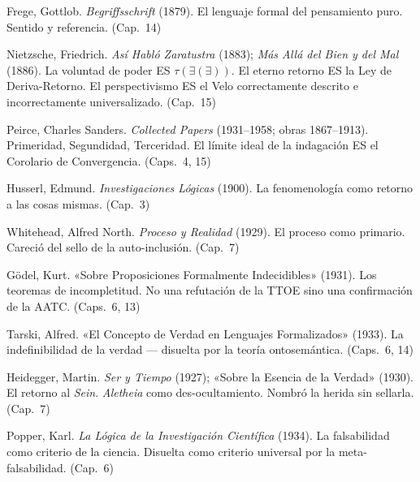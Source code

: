 \documentclass[10pt, openany, oneside]{book}
\begin{document}
{\noindent Frege, Gottlob. \textit{Begriffsschrift} (1879). El lenguaje formal del pensamiento puro. Sentido y referencia. (Cap.\ 14)

\vspace{0.3em}

\noindent Nietzsche, Friedrich. \textit{Así Habló Zaratustra} (1883); \textit{Más Allá del Bien y del Mal} (1886). La voluntad de poder ES $\tau(\exists(\exists))$. El eterno retorno ES la Ley de Deriva-Retorno. El perspectivismo ES el Velo correctamente descrito e incorrectamente universalizado. (Cap.\ 15)

\vspace{0.3em}

\noindent Peirce, Charles Sanders. \textit{Collected Papers} (1931--1958; obras 1867--1913). Primeridad, Segundidad, Terceridad. El límite ideal de la indagación ES el Corolario de Convergencia. (Caps.\ 4, 15)

\vspace{0.3em}

\noindent Husserl, Edmund. \textit{Investigaciones Lógicas} (1900). La fenomenología como retorno a las cosas mismas. (Cap.\ 3)

\vspace{0.3em}

\noindent Whitehead, Alfred North. \textit{Proceso y Realidad} (1929). El proceso como primario. Careció del sello de la auto-inclusión. (Cap.\ 7)

\vspace{0.3em}

\noindent G\"{o}del, Kurt. «Sobre Proposiciones Formalmente Indecidibles» (1931). Los teoremas de incompletitud. No una refutación de la TTOE sino una confirmación de la AATC. (Caps.\ 6, 13)

\vspace{0.3em}

\noindent Tarski, Alfred. «El Concepto de Verdad en Lenguajes Formalizados» (1933). La indefinibilidad de la verdad --- disuelta por la teoría ontosemántica. (Caps.\ 6, 14)

\vspace{0.3em}

\noindent Heidegger, Martin. \textit{Ser y Tiempo} (1927); «Sobre la Esencia de la Verdad» (1930). El retorno al \textit{Sein}. \textit{Aletheia} como des-ocultamiento. Nombró la herida sin sellarla. (Cap.\ 7)

\vspace{0.3em}

\noindent Popper, Karl. \textit{La Lógica de la Investigación Científica} (1934). La falsabilidad como criterio de la ciencia. Disuelta como criterio universal por la meta-falsabilidad. (Cap.\ 6)

}
\end{document}
